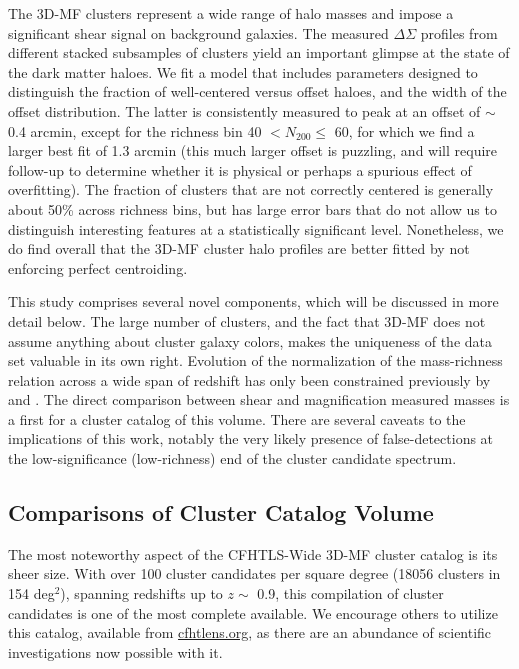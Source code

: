 The \ac{3D-MF} clusters represent a wide range of halo masses and impose a significant shear signal on background galaxies. The measured $\Delta \Sigma$ profiles from different stacked subsamples of clusters yield an important glimpse at the state of the dark matter haloes. We fit a model that includes parameters designed to distinguish the fraction of well-centered versus offset haloes, and the width of the offset distribution. The latter is consistently measured to peak at an offset of $\sim$ 0.4 arcmin, except for the richness bin 40 $< N_{200} \leq$ 60, for which we find a larger best fit of 1.3 arcmin (this much larger offset is puzzling, and will require follow-up to determine whether it is physical or perhaps a spurious effect of overfitting). The fraction of clusters that are not correctly centered is generally about 50\% across richness bins, but has large error bars that do not allow us to distinguish interesting features at a statistically significant level. Nonetheless, we do find overall that the \ac{3D-MF} cluster halo profiles are better fitted by not enforcing perfect centroiding.

This study comprises several novel components, which will be discussed in more detail below. The large number of clusters, and the fact that \ac{3D-MF} does not assume anything about cluster galaxy colors, makes the uniqueness of the data set valuable in its own right.  Evolution of the normalization of the mass-richness relation across a wide span of redshift has only been constrained previously by \citet{EdoThesis12} and \citet{Andreon14}. The direct comparison between shear and magnification measured masses is a first for a cluster catalog of this volume. There are several caveats to the implications of this work, notably the very likely presence of false-detections at the low-significance (low-richness) end of the cluster candidate spectrum.



\subsection{Comparisons of Cluster Catalog Volume}

The most noteworthy aspect of the \ac{CFHTLS}-Wide \ac{3D-MF} cluster catalog is its sheer size. With over 100 cluster candidates per square degree (18056 clusters in 154 deg$^2$), spanning redshifts up to $z \sim$ 0.9, this compilation of cluster candidates is one of the most complete available. We encourage others to utilize this catalog, available from \url{cfhtlens.org}, as there are an abundance of scientific investigations now possible with it. 

